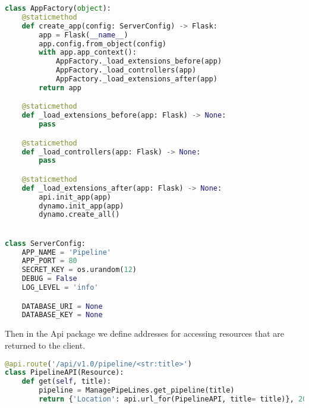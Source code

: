 \begin{lstlisting}[language=Python]
class AppFactory(object):
    @staticmethod
    def create_app(config: ServerConfig) -> Flask:
        app = Flask(__name__)
        app.config.from_object(config)
        with app.app_context():
            AppFactory._load_extensions_before(app)
            AppFactory._load_controllers(app)
            AppFactory._load_extensions_after(app)
        return app

    @staticmethod
    def _load_extensions_before(app: Flask) -> None:
        pass

    @staticmethod
    def _load_controllers(app: Flask) -> None:
        pass

    @staticmethod
    def _load_extensions_after(app: Flask) -> None:
        api.init_app(app)
        dynamo.init_app(app)
        dynamo.create_all()


class ServerConfig:
    APP_NAME = 'Pipeline'
    APP_PORT = 80
    SECRET_KEY = os.urandom(12)
    DEBUG = False
    LOG_LEVEL = 'info'

    DATABASE_URI = None
    DATABASE_KEY = None
\end{lstlisting}

Then in the Api package we define addresses for accessing resources that are returned to the client.

\begin{lstlisting}[language=Python]
@api.route('/api/v1.0/pipeline/<str:title>')
class PipelineAPI(Resource):
    def get(self, title):
        pipeline = ManagePipeLines.get_pipeline(title)
        return {'Location': api.url_for(PipelineAPI, title= title)}, 201
\end{lstlisting}
